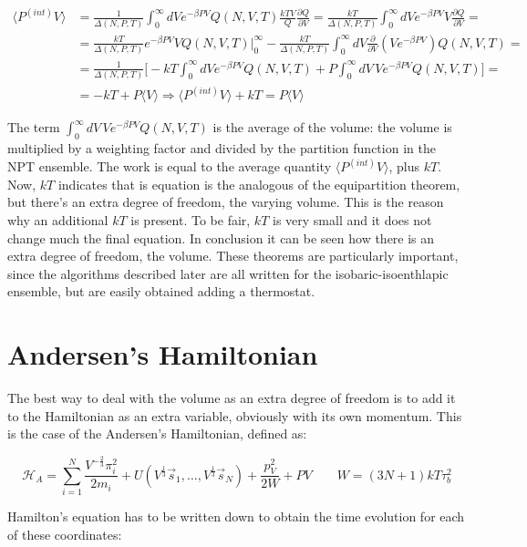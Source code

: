 	\begin{align*}
		\langle P^{(int)}V\rangle &= \frac{1}{\Delta(N, P, T)}\int_0^{\infty}dVe^{-\beta PV}Q(N, V, T)\frac{kTV}{Q}\frac{\partial Q}{\partial V} = \frac{kT}{\Delta(N, P, T)}\int_0^{\infty}dVe^{-\beta PV}V\frac{\partial Q}{\partial V} = \\
															&=\frac{kT}{\Delta(N, P, T)}e^{-\beta PV}VQ(N, V, T)|_{0}^{\infty}-\frac{kT}{\Delta(N, P, T)}\int_0^{\infty}dV\frac{\partial}{\partial V}(Ve^{-\beta PV})Q(N, V, T)=\\
															&= \frac{1}{\Delta(N, P, T)}\biggl[-kT\int_0^{\infty}dVe^{-\beta PV}Q(N, V, T) + P\int_0^{\infty}dV \, Ve^{-\beta PV}Q(N, V, T)\biggr]=\\
															&=-kT+P\langle V\rangle \Rightarrow \langle P^{(int)}V\rangle + kT = P\langle V\rangle
	\end{align*}

	The term $\int_0^{\infty}dV \, Ve^{-\beta PV}Q(N, V, T)$ is the average of the volume: the volume is multiplied by a weighting factor and divided by the partition function in the NPT ensemble.
	The work is equal to the average quantity $\langle P^{(int)}V\rangle$, plus $kT$.
	Now, $kT$ indicates that is equation is the analogous of the equipartition theorem, but there's an extra degree of freedom, the varying volume.
	This is the reason why an additional $kT$ is present.
	To be fair, $kT$ is very small and it does not change much the final equation.
	In conclusion it can be seen how there is an extra degree of freedom, the volume.
	These theorems are particularly important, since the algorithms described later are all written for the isobaric-isoenthlapic ensemble, but are easily obtained adding a thermostat.

\section{Andersen's Hamiltonian}
The best way to deal with the volume as an extra degree of freedom is to add it to the Hamiltonian as an extra variable, obviously with its own momentum.
This is the case of the Andersen's Hamiltonian, defined as:

$$\mathcal{H}_A = \sum\limits_{i=1}^N\frac{V^{-\frac{2}{3}}\pi_i^2}{2m_i}+ U(V^\frac{1}{3}\vec{s}_1, \dots, V^{\frac{1}{3}}\vec{s}_N) + \frac{p_V^2}{2W} + PV\qquad W = (3N+1)kT\tau_b^2$$

Hamilton's equation has to be written down to obtain the time evolution for each of these coordinates:


